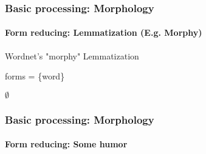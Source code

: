 \documentclass[xcolor=table]{beamer}
\begin{document}
\begin{frame}[fragile]
\frametitle{Basic processing: Morphology}
\framesubtitle{Form reducing: Lemmatization (E.g. Morphy)}

\begin{block}{Wordnet's "morphy" Lemmatization}
	\footnotesize
	\begin{algorithm}[H]
		\vskip-3pt
		
		
		forms = \{word\}\;
		
		
		\Return $ \emptyset $\;

	\end{algorithm}
\end{block}

\end{frame}

\begin{frame}
\frametitle{Basic processing: Morphology}
\framesubtitle{Form reducing: Some humor}

\begin{center}
\end{center}

\end{frame}

\end{document}
